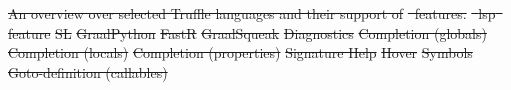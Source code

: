 \documentclass[sigplan,10pt,review,anonymous]{acmart}
\let\tableinsidecommand\relax
\providecommand{\DIFdel}[1]{{\protect\color{red}\sout{#1}}}                      %
\providecommand{\DIFdelbegin}{} %
\providecommand{\DIFdelFL}[1]{\DIFdel{#1}} %
\begin{document}
\DIFdelbegin %
{%
\DIFdelFL{An overview over selected Truffle languages and their support of }%
\DIFdelFL{~features. %
      }}
\DIFdelFL{\mbox{%
\ac{lsp} }\hspace{0pt}%
feature }%
\DIFdelFL{SL }%
\DIFdelFL{GraalPython }%
\DIFdelFL{FastR}%
\DIFdelFL{GraalSqueak}%
\DIFdelFL{Diagnostics             }%
\DIFdelFL{Completion (globals)    }%
\DIFdelFL{Completion (locals)     }%
\DIFdelFL{Completion (properties) }%
\DIFdelFL{Signature Help          }%
\DIFdelFL{Hover                   }%
\DIFdelFL{Symbols                 }%
\DIFdelFL{Goto-definition (callables)              }%
\end{document}
